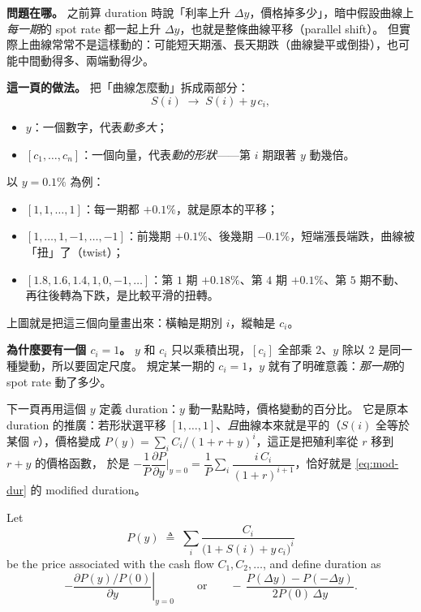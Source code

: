\begin{remark}
	\textbf{問題在哪。}
	之前算 duration 時說「利率上升 $\Delta y$，價格掉多少」，暗中假設曲線上\emph{每一期}的 spot rate 都一起上升 $\Delta y$，也就是整條曲線平移（parallel shift）。
	但實際上曲線常常不是這樣動的：可能短天期漲、長天期跌（曲線變平或倒掛），也可能中間動得多、兩端動得少。

	\textbf{這一頁的做法。}
	把「曲線怎麼動」拆成兩部分：
	\[
		S(i) \;\longrightarrow\; S(i) + y\,c_{i} ,
	\]
	\begin{itemize}[nosep]
		\item $y$：一個數字，代表\emph{動多大}；
		\item $[c_{1},\ldots,c_{n}]$：一個向量，代表\emph{動的形狀}——第 $i$ 期跟著 $y$ 動幾倍。
	\end{itemize}
	以 $y=0.1\%$ 為例：
	\begin{itemize}[nosep]
		\item $[1,1,\ldots,1]$：每一期都 $+0.1\%$，就是原本的平移；
		\item $[1,\ldots,1,-1,\ldots,-1]$：前幾期 $+0.1\%$、後幾期 $-0.1\%$，短端漲長端跌，曲線被「扭」了（twist）；
		\item $[1.8,1.6,1.4,1,0,-1,\ldots]$：第 $1$ 期 $+0.18\%$、第 $4$ 期 $+0.1\%$、第 $5$ 期不動、再往後轉為下跌，是比較平滑的扭轉。
	\end{itemize}
	上圖就是把這三個向量畫出來：橫軸是期別 $i$，縱軸是 $c_{i}$。

	\textbf{為什麼要有一個 $c_{i}=1$。}
	$y$ 和 $c_{i}$ 只以乘積出現，$[c_{i}]$ 全部乘 $2$、$y$ 除以 $2$ 是同一種變動，所以要固定尺度。
	規定某一期的 $c_{i}=1$，$y$ 就有了明確意義：\emph{那一期}的 spot rate 動了多少。

	下一頁再用這個 $y$ 定義 duration：$y$ 動一點點時，價格變動的百分比。
	它是原本 duration 的推廣：若形狀選平移 $[1,\ldots,1]$、\emph{且}曲線本來就是平的（$S(i)$ 全等於某個 $r$），價格變成 $P(y)=\sum_{i} C_{i}/(1+r+y)^{i}$，這正是把殖利率從 $r$ 移到 $r+y$ 的價格函數，
	於是 $-\dfrac{1}{P}\dfrac{\partial P}{\partial y}\Big|_{y=0}=\dfrac{1}{P}\sum_{i}\dfrac{i\,C_{i}}{(1+r)^{i+1}}$，恰好就是 \eqref{eq:mod-dur} 的 modified duration。
\end{remark}
\suppend


\begin{definition}
	Let
	\begin{equation}
		P(y) \;\triangleq\; \sum_{i} \frac{C_{i}}{\bigl(1+S(i)+y\,c_{i}\bigr)^{i}} \label{eq:dur-shift}
	\end{equation}
	be the price associated with the cash flow $C_{1},C_{2},\ldots$, and define duration as
	\[
		-\left.\frac{\partial P(y)/P(0)}{\partial y}\right|_{y=0}
		\qquad\text{or}\qquad
		-\,\frac{P(\Delta y)-P(-\Delta y)}{2P(0)\,\Delta y} .
	\]
\end{definition}

